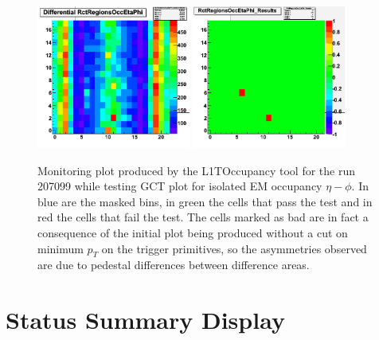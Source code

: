 \begin{figure}[!htb]
\centering
\includegraphics[width=0.45\textwidth]{Chapter03/L1TOnline/Images/L1TOccupancy_Diff.png}
\includegraphics[width=0.45\textwidth]{Chapter03/L1TOnline/Images/L1TOccupancy_Results.png}
\caption{Monitoring plot produced by the L1TOccupancy tool for the run 207099 while testing GCT plot for isolated
EM occupancy $\eta-\phi$. In blue are the masked bins, in green the cells that pass the test and in red the cells
that fail the test. The cells marked as bad are in fact a consequence of the initial plot being produced without
a cut on minimum $p_T$ on the trigger primitives, so the asymmetries observed are due to pedestal differences between
difference areas.}
\label{figure_ServiceWork_L1TOccupancy}
\end{figure}

\section{Status Summary Display}


